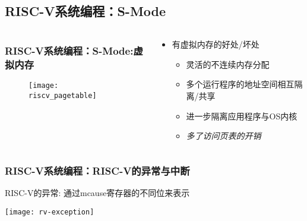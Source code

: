 \subsection{RISC-V系统编程：S-Mode}
\begin{frame}[plain]
    
    \begin{columns}
        \begin{column}{0.6\textwidth}
            
            \frametitle{RISC-V系统编程：S-Mode:虚拟内存}
            
            \begin{figure}
                \centering
                \texttt{[image: riscv\_pagetable]}
            \end{figure}
            
        \end{column}
        
        \begin{column}{0.4\textwidth}
            
            \begin{itemize}
                \item 有虚拟内存的好处/坏处
                \begin{itemize}
                    \item 灵活的不连续内存分配
                    \item 多个运行程序的地址空间相互隔离/共享
                    \item 进一步隔离应用程序与OS内核
                    \item \textit{多了访问页表的开销} 
                \end{itemize} 
            \end{itemize}
            
        \end{column}
        
    \end{columns}
    
    
\end{frame}



\begin{frame}
    \frametitle{RISC-V系统编程：RISC-V的异常与中断}
    RISC-V的异常: 通过mcause寄存器的不同位来表示
    
    \centering
    \texttt{[image: rv-exception]}
    
\end{frame}

